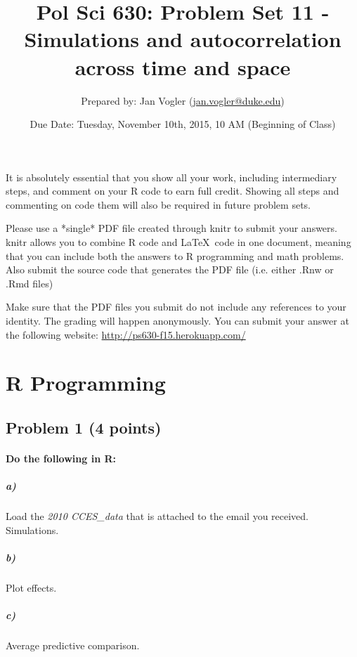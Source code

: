 \documentclass[12pt]{article}
\begin{document}
\title{Pol Sci 630: Problem Set 11 - Simulations and autocorrelation across time and space}

\author{Prepared by: Jan Vogler (\href{mailto:jan.vogler@duke.edu}{jan.vogler@duke.edu})}

\date{Due Date: Tuesday, November 10th, 2015, 10 AM (Beginning of Class)}
 
\maketitle 



It is absolutely essential that you show all your work, including intermediary steps, and comment on your R code to earn full credit. Showing all steps and commenting on code them will also be required in future problem sets.

Please use a *single* PDF file created through knitr to submit your answers. knitr allows you to combine R code and \LaTeX \ code in one document, meaning that you can include both the answers to R programming and math problems. Also submit the source code that generates the PDF file (i.e. either .Rnw or .Rmd files)

Make sure that the PDF files you submit do not include any references to your identity. The grading will happen anonymously. You can submit your answer at the following website: \url{http://ps630-f15.herokuapp.com/}



\section*{R Programming}

\subsection*{Problem 1 (4 points)}

\paragraph{Do the following in R:}

\subparagraph{a)} Load the \textit{2010 CCES\_data} that is attached to the email you received. Simulations.

\subparagraph{b)} Plot effects.

\subparagraph{c)} Average predictive comparison.
\end{document}
